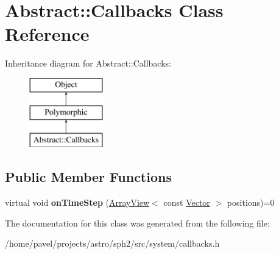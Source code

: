 \hypertarget{classAbstract_1_1Callbacks}{}\section{Abstract\+:\+:Callbacks Class Reference}
\label{classAbstract_1_1Callbacks}
Inheritance diagram for Abstract\+:\+:Callbacks\+:\begin{figure}[H]
\begin{center}
\leavevmode
\includegraphics[height=3.000000cm]{classAbstract_1_1Callbacks}
\end{center}
\end{figure}
\subsection*{Public Member Functions}
\begin{DoxyCompactItemize}
\item 
\hypertarget{classAbstract_1_1Callbacks_a3e98ef18d54fb6f8a08df71f2d13cb9c}{}\label{classAbstract_1_1Callbacks_a3e98ef18d54fb6f8a08df71f2d13cb9c} 
virtual void {\bfseries on\+Time\+Step} (\hyperlink{classArrayView}{Array\+View}$<$ const \hyperlink{classBasicVector}{Vector} $>$ positions)=0
\end{DoxyCompactItemize}


The documentation for this class was generated from the following file\+:\begin{DoxyCompactItemize}
\item 
/home/pavel/projects/astro/sph2/src/system/callbacks.\+h\end{DoxyCompactItemize}
